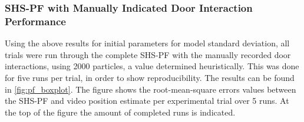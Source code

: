 %
%

\subsubsection{SHS-PF with Manually Indicated Door Interaction Performance}
Using the above results for initial parameters for model standard deviation, all trials were run through the complete SHS-PF with the manually recorded door interactions, using 2000 particles, a value determined heuristically. This was done for five runs per trial, in order to show reproducibility. The results can be found in \cref{fig:pf_boxplot}. The figure shows the root-mean-square errors values between the SHS-PF and video position estimate per experimental trial over 5 runs. At the top of the figure the amount of completed runs is indicated.

